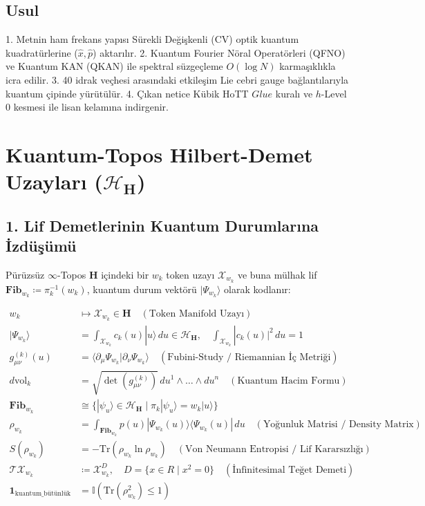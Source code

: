 \documentclass[11pt, a4paper]{article}
\begin{document}
\subsection{Usul}
1. Metnin ham frekans yapısı Sürekli Değişkenli (CV) optik kuantum kuadratürlerine ($\hat{x}, \hat{p}$) aktarılır.
2. Kuantum Fourier Nöral Operatörleri (QFNO) ve Kuantum KAN (QKAN) ile spektral süzgeçleme $O(\log N)$ karmaşıklıkla icra edilir.
3. 40 idrak veçhesi arasındaki etkileşim Lie cebri gauge bağlantılarıyla kuantum çipinde yürütülür.
4. Çıkan netice Kübik HoTT $Glue$ kuralı ve $h$-Level 0 kesmesi ile lisan kelamına indirgenir.

\section{Kuantum-Topos Hilbert-Demet Uzayları ($\mathcal{H}_{\mathbf{H}}$)}

\subsection{1. Lif Demetlerinin Kuantum Durumlarına İzdüşümü}
Pürüzsüz $\infty$-Topos $\mathbf{H}$ içindeki bir $w_k$ token uzayı $\mathcal{X}_{w_k}$ ve buna mülhak lif $\mathbf{Fib}_{w_k} \coloneqq \pi_k^{-1}(w_k)$, kuantum durum vektörü $|\Psi_{w_k}\rangle$ olarak kodlanır:

\begin{align}
w_k &\longmapsto \mathcal{X}_{w_k} \in \mathbf{H} \quad (\text{Token Manifold Uzayı}) \\
|\Psi_{w_k}\rangle &= \int_{\mathcal{X}_{w_k}} c_k(u) |u\rangle \, du \in \mathcal{H}_{\mathbf{H}}, \quad \int_{\mathcal{X}_{w_k}} |c_k(u)|^2 \, du = 1 \\
g_{\mu\nu}^{(k)}(u) &= \langle \partial_\mu \Psi_{w_k} | \partial_\nu \Psi_{w_k} \rangle \quad (\text{Fubini-Study / Riemannian İç Metriği}) \\
d\text{vol}_k &= \sqrt{\det(g_{\mu\nu}^{(k)})} \, du^1 \wedge \dots \wedge du^n \quad (\text{Kuantum Hacim Formu}) \\
\mathbf{Fib}_{w_k} &\cong \{ |\psi_u\rangle \in \mathcal{H}_{\mathbf{H}} \mid \hat{\pi}_k |\psi_u\rangle = w_k |u\rangle \} \\
\rho_{w_k} &= \int_{\mathbf{Fib}_{w_k}} p(u) |\Psi_{w_k}(u)\rangle \langle \Psi_{w_k}(u)| \, du \quad (\text{Yoğunluk Matrisi / Density Matrix}) \\
S(\rho_{w_k}) &= -\text{Tr}(\rho_{w_k} \ln \rho_{w_k}) \quad (\text{Von Neumann Entropisi / Lif Kararsızlığı}) \\
\mathcal{T}\mathcal{X}_{w_k} &\coloneqq \mathcal{X}_{w_k}^D, \quad D = \{x \in R \mid x^2 = 0\} \quad (\text{İnfinitesimal Teğet Demeti}) \\
\mathbf{1}_{\text{kuantum\_bütünlük}} &= \mathbb{I}\left( \text{Tr}(\rho_{w_k}^2) \le 1 \right)
\end{align}
\end{document}
